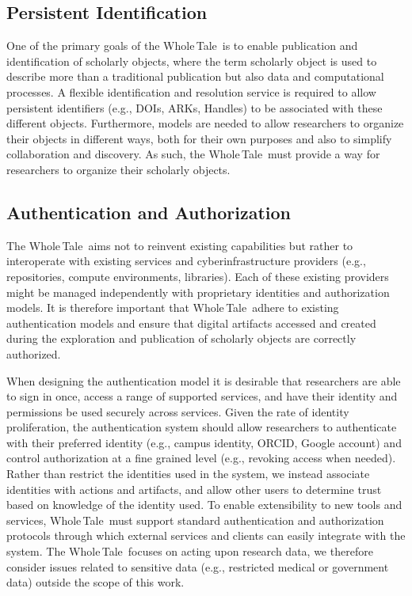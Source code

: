 \documentclass{elsarticle}
\newcommand{\wt}{Whole\,Tale}
\begin{document}
\subsection{Persistent Identification} 
One of the primary goals of the \wt\ is to enable publication and identification
of scholarly objects, where the term scholarly object is used to describe more than a traditional publication but also
data and computational processes. A flexible identification and resolution service
is required to allow persistent identifiers (e.g., DOIs, ARKs, Handles) to be associated with these
different objects. 
Furthermore, models are needed to allow
researchers to organize their objects in different ways, both for their own purposes and
also to simplify collaboration and discovery. As such, the \wt\ must provide a way for researchers to organize their scholarly objects. 


\subsection{Authentication and Authorization}
The \wt\ aims not to reinvent existing capabilities but rather
to interoperate with existing services
and cyberinfrastructure providers
(e.g., repositories, compute environments, libraries). Each of these existing providers
might be managed independently with proprietary identities and authorization models. 
It is therefore important that \wt\ adhere to existing authentication
models and ensure that digital artifacts accessed and created during the exploration 
and publication of scholarly objects are correctly authorized. 

When designing the authentication model it is desirable that researchers 
are able to sign in once, 
access a range of supported services, and have their identity and permissions 
be used securely across services. 
Given the rate of identity proliferation, the authentication system should allow
researchers to authenticate with their preferred identity (e.g., campus identity, 
ORCID, Google account)
and control authorization at a fine grained level (e.g., revoking access
when needed). 
Rather than restrict the identities used in the system, we instead associate identities with actions and artifacts, and allow other users to determine 
trust based on knowledge of the identity used.
To enable extensibility to new tools and services, \wt\ must support standard authentication
and authorization protocols through which external services and clients can easily integrate
with the system.
The \wt\ focuses on acting upon research data, we therefore consider 
issues related to sensitive data (e.g., restricted medical or government data) outside
the scope of this work.
\end{document}
